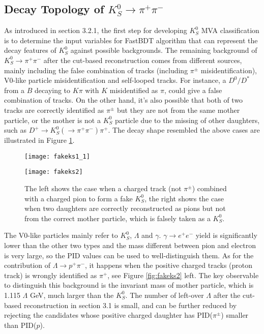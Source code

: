 

\subsection{Decay Topology of $K_S^0 \to \pi^+ \pi^-$}
As introduced in section 3.2.1, the first step for developing $K_S^0$ MVA classification is to determine the input variables for FastBDT algorithm that can represent the decay features of $K_S^0$ against possible backgrounds.
The remaining background of  $K_S^0 \to \pi^+ \pi^-$ after the cut-based reconstruction comes from different sources, mainly including the false combination of tracks (including $\pi^{\pm}$ misidentification), V0-like particle misidentification and self-looped tracks.
For instance, a $D^0/D^*$ from a $B$ decaying to $K\pi$ with $K$ misidentified as $\pi$, could give a false combination of tracks. On the other hand, it's also possible that both of two tracks are correctly identified as $\pi^{\pm}$ but they are not from the same mother particle, or the mother is not a $K_S^0$ particle due to the missing of other daughters, such as $D^+ \to K_S^0 (  \to \pi^+ \pi^-) \pi^+$. The decay shape resembled the above cases are illustrated in Figure \ref{fig:fakeks1}. 


\begin{figure}[htpb]
	\begin{minipage}[t]{0.5\linewidth} %
		\centering 
		\texttt{[image: fakeks1\_1]} 
	\end{minipage}%
	\begin{minipage}[t]{0.5\linewidth} 
		\centering 
		\texttt{[image: fakeks2]} 
	\end{minipage}%
	
	\caption{The left shows the case when a charged track (not $\pi^{\pm}$) combined with a charged pion to form a fake $K_S^0$, the right shows the case when two daughters are correctly reconstructed as pions but not from the correct mother particle, which is falsely taken as a $K_S^0$.}
	\label{fig:fakeks1}
\end{figure}

The V0-like particles mainly refer to $K_S^0$, $\Lambda$ and $\gamma$. $\gamma \to e^+ e^-$ yield is significantly lower than the other two types and the mass different between pion and electron is very large, so the PID values can be used to well-distinguish them. As for the contribution of $\Lambda \to p^+ \pi^-$, it happens when the positive charged tracks (proton track) is wrongly identified as $\pi^+$, see Figure \ref{fig:fakeks2} left. The key observable to distinguish this background is the invariant mass of mother particle, which is 1.115 $\Lambda$ GeV, much larger than the $K_S^0$. The number of left-over $\Lambda$ after the cut-based reconstruction in section 3.1 is small, and can be further reduced by rejecting the candidates whose positive charged daughter has PID($\pi^{\pm}$) smaller than PID($p$).


